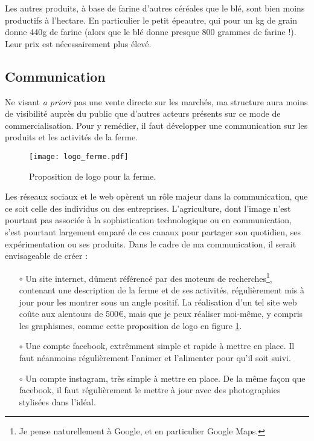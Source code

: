 \documentclass{book}
\begin{document}
Les autres produits, à base de farine d’autres céréales que le blé, sont bien moins productifs à l’hectare. En particulier le petit épeautre, qui pour un kg de grain donne 440g de farine (alors que le blé donne presque 800 grammes de farine !). Leur prix est nécessairement plus élevé. 

\subsection{Communication}

Ne visant \textit{a priori} pas une vente directe sur les marchés, ma structure aura moins de visibilité auprès du public que d'autres acteurs présents sur ce mode de commercialisation. Pour y remédier, il faut développer une communication sur les produits et les activités de la ferme.

\begin{figure}[h!]
\begin{center}
	\texttt{[image: logo\_ferme.pdf]}
	\caption{Proposition de logo pour la ferme.}
	\label{fig:logo}
\end{center}
\end{figure}

Les réseaux sociaux et le web opèrent un rôle majeur dans la communication, que ce soit celle des individus ou des entreprises. L’agriculture, dont l’image n’est pourtant pas associée à la sophistication technologique ou en communication, s’est pourtant largement emparé de ces canaux pour partager son quotidien, ses expérimentation ou ses produits. Dans le cadre de ma communication, il serait envisageable de créer :
\begin{itemize}

	\item[$\circ$] Un site internet, dûment référencé par des moteurs de recherches\footnote{Je pense naturellement à Google, et en particulier Google Maps.}, contenant une description de la ferme et de ses activités, régulièrement mis à jour pour les montrer sous un angle positif. La réalisation d'un tel site web coûte aux alentours de 500\euro{}, mais que je peux réaliser moi-même, y compris les graphismes, comme cette proposition de logo en figure \ref{fig:logo}.
	
	\item[$\circ$] Une compte facebook, extrêmment simple et rapide à mettre en place. Il faut néanmoins régulièrement l'animer et l'alimenter pour qu'il soit suivi.
	
	\item[$\circ$] Un compte instagram, très simple à mettre en place. De la même façon que facebook, il faut régulièrement le mettre à jour avec des photographies stylisées dans l'idéal.

\end{itemize}
\end{document}
